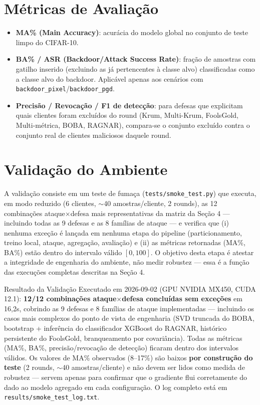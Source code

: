 \documentclass[11pt,a4paper]{article}
\begin{document}
\section{Métricas de Avaliação}
\begin{itemize}
\item \textbf{MA\% (Main Accuracy)}: acurácia do modelo global no conjunto de teste limpo do CIFAR-10.
\item \textbf{BA\% / ASR (Backdoor/Attack Success Rate)}: fração de amostras com gatilho inserido
  (excluindo as já pertencentes à classe alvo) classificadas como a classe alvo do backdoor. Aplicável
  apenas aos cenários com \texttt{backdoor\_pixel}/\texttt{backdoor\_pgd}.
\item \textbf{Precisão / Revocação / F1 de detecção}: para defesas que explicitam quais clientes foram
  excluídos do round (Krum, Multi-Krum, FoolsGold, Multi-métrica, BOBA, RAGNAR), compara-se o conjunto
  excluído contra o conjunto real de clientes maliciosos daquele round.
\end{itemize}

\section{Validação do Ambiente}
A validação consiste em um teste de fumaça (\texttt{tests/smoke\_test.py}) que executa, em modo reduzido
(6 clientes, $\sim$40 amostras/cliente, 2 rounds), as 12 combinações ataque$\times$defesa mais
representativas da matriz da Seção 4 — incluindo todas as 9 defesas e as 8 famílias de ataque — e verifica
que (i) nenhuma exceção é lançada em nenhuma etapa do pipeline (particionamento, treino local, ataque,
agregação, avaliação) e (ii) as métricas retornadas (MA\%, BA\%) estão dentro do intervalo válido
$[0,100]$. O objetivo desta etapa é atestar a integridade de engenharia do ambiente, não medir robustez —
essa é a função das execuções completas descritas na Seção 4.

\begin{calloutbox}{Resultado da Validação}
Executado em 2026-09-02 (GPU NVIDIA MX450, CUDA 12.1): \textbf{12/12 combinações ataque$\times$defesa
concluídas sem exceções} em 16,2s, cobrindo as 9 defesas e 8 famílias de ataque implementadas — incluindo
os casos mais complexos do ponto de vista de engenharia (SVD truncada do BOBA, bootstrap + inferência do
classificador XGBoost do RAGNAR, histórico persistente do FoolsGold, branqueamento por covariância).
Todas as métricas (MA\%, BA\%, precisão/revocação de detecção) ficaram dentro dos intervalos válidos. Os
valores de MA\% observados (8--17\%) são baixos \textbf{por construção do teste} (2 rounds, $\sim$40
amostras/cliente) e não devem ser lidos como medida de robustez — servem apenas para confirmar que o
gradiente flui corretamente do dado ao modelo agregado em cada configuração. O log completo está em
\texttt{results/smoke\_test\_log.txt}.
\end{calloutbox}
\end{document}
